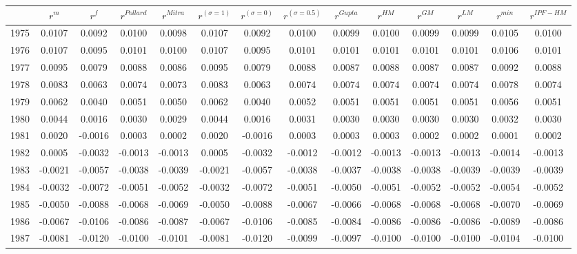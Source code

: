 \begin{tabular}{cccccccccccccc}
  \hline
 & $r^m$ & $r^f$ & $r^{Pollard}$ & $r^{Mitra}$ & $r^{(\sigma = 1)}$ & $r^{(\sigma = 0)}$ & $r^{(\sigma = 0.5)}$ & $r^{Gupta}$ & $r^{HM}$ & $r^{GM}$ & $r^{LM}$ & $r^{min}$ & $r^{IPF-HM}$ \\ 
  \hline
1975 & 0.0107 & 0.0092 & 0.0100 & 0.0098 & 0.0107 & 0.0092 & 0.0100 & 0.0099 & 0.0100 & 0.0099 & 0.0099 & 0.0105 & 0.0100 \\ 
  1976 & 0.0107 & 0.0095 & 0.0101 & 0.0100 & 0.0107 & 0.0095 & 0.0101 & 0.0101 & 0.0101 & 0.0101 & 0.0101 & 0.0106 & 0.0101 \\ 
  1977 & 0.0095 & 0.0079 & 0.0088 & 0.0086 & 0.0095 & 0.0079 & 0.0088 & 0.0087 & 0.0088 & 0.0087 & 0.0087 & 0.0092 & 0.0088 \\ 
  1978 & 0.0083 & 0.0063 & 0.0074 & 0.0073 & 0.0083 & 0.0063 & 0.0074 & 0.0074 & 0.0074 & 0.0074 & 0.0074 & 0.0078 & 0.0074 \\ 
  1979 & 0.0062 & 0.0040 & 0.0051 & 0.0050 & 0.0062 & 0.0040 & 0.0052 & 0.0051 & 0.0051 & 0.0051 & 0.0051 & 0.0056 & 0.0051 \\ 
  1980 & 0.0044 & 0.0016 & 0.0030 & 0.0029 & 0.0044 & 0.0016 & 0.0031 & 0.0030 & 0.0030 & 0.0030 & 0.0030 & 0.0032 & 0.0030 \\ 
  1981 & 0.0020 & -0.0016 & 0.0003 & 0.0002 & 0.0020 & -0.0016 & 0.0003 & 0.0003 & 0.0003 & 0.0002 & 0.0002 & 0.0001 & 0.0002 \\ 
  1982 & 0.0005 & -0.0032 & -0.0013 & -0.0013 & 0.0005 & -0.0032 & -0.0012 & -0.0012 & -0.0013 & -0.0013 & -0.0013 & -0.0014 & -0.0013 \\ 
  1983 & -0.0021 & -0.0057 & -0.0038 & -0.0039 & -0.0021 & -0.0057 & -0.0038 & -0.0037 & -0.0038 & -0.0038 & -0.0039 & -0.0039 & -0.0039 \\ 
  1984 & -0.0032 & -0.0072 & -0.0051 & -0.0052 & -0.0032 & -0.0072 & -0.0051 & -0.0050 & -0.0051 & -0.0052 & -0.0052 & -0.0054 & -0.0052 \\ 
  1985 & -0.0050 & -0.0088 & -0.0068 & -0.0069 & -0.0050 & -0.0088 & -0.0067 & -0.0066 & -0.0068 & -0.0068 & -0.0068 & -0.0070 & -0.0069 \\ 
  1986 & -0.0067 & -0.0106 & -0.0086 & -0.0087 & -0.0067 & -0.0106 & -0.0085 & -0.0084 & -0.0086 & -0.0086 & -0.0086 & -0.0089 & -0.0086 \\ 
  1987 & -0.0081 & -0.0120 & -0.0100 & -0.0101 & -0.0081 & -0.0120 & -0.0099 & -0.0097 & -0.0100 & -0.0100 & -0.0100 & -0.0104 & -0.0100 \\ 

\end{tabular}
